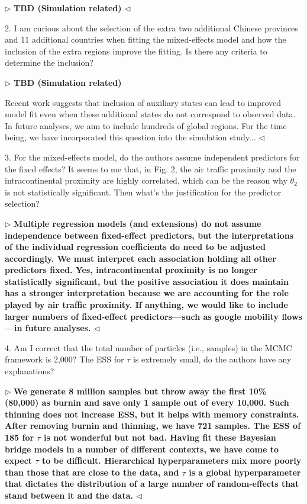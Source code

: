\documentclass[12pt]{article}
\newenvironment{reply}{$\triangleright$\bfseries}{$\triangleleft$}
\begin{document}
\begin{reply}
TBD (Simulation related)
\end{reply}

2. I am curious about the selection of the extra two additional Chinese provinces and 11 additional countries when fitting the mixed-effects model and how the inclusion of the extra regions improve the fitting. Is there any criteria to determine the inclusion?


\begin{reply}
TBD (Simulation related)

Recent work \citep{gotovos2021scaling} suggests that inclusion of auxiliary states can lead to improved model fit even when these additional states do not correspond to observed data.  In future analyses, we aim to include hundreds of global regions.  For the time being, we have incorporated this question into the simulation study...
\end{reply}

3. For the mixed-effects model, do the authors assume independent predictors for the fixed effects? It seems to me that, in Fig. 2, the air traffic proximity and the intracontinental proximity are highly correlated, which can be the reason why $\theta_2$ is not statistically significant. Then what’s the justification for the predictor selection?


\begin{reply}
Multiple regression models (and extensions) do not assume independence between fixed-effect predictors, but the interpretations of the individual regression coefficients do need to be adjusted accordingly. We must interpret each association holding all other predictors fixed.  Yes, intracontinental proximity is no longer statistically significant, but the positive association it does maintain has a stronger interpretation because we are accounting for the role played by air traffic proximity.    If anything, we would like to include larger numbers of fixed-effect predictors---such as google mobility flows \citep{lemey2021untangling}---in future analyses.
\end{reply}

4. Am I correct that the total number of particles (i.e., samples) in the MCMC framework is 2,000? The ESS for $\tau$ is extremely small, do the authors have any explanations?


\begin{reply}
We generate 8 million samples but throw away the first 10\% (80,000) as burnin and save only 1 sample out of every 10,000.  Such thinning does not increase ESS, but it helps with memory constraints.  After removing burnin and thinning, we have 721 samples.   The ESS of 185 for $\tau$ is not wonderful but not bad.  Having fit these Bayesian bridge models in a number of different contexts, we have come to expect $\tau$ to be difficult.   Hierarchical hyperparameters mix more poorly than those that are close to the data, and $\tau$ is a global hyperparameter that dictates the distribution of a large number of random-effects that stand between it and the data.
\end{reply}
\end{document}
